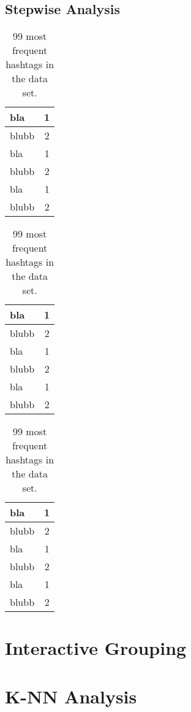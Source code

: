 \subsection{Stepwise Analysis}
        \begin{table}[H]
        	\footnotesize
        	\begin{tabular}[t]{|p{3.2cm}|c|}
        		\hline
        		bla&1\\ \hline
        		blubb&2 \\ \hline
        		bla&1\\ \hline
        		blubb&2 \\ \hline   
        		bla&1\\ \hline
        		blubb&2 \\ \hline   
        	\end{tabular}
        	\hfill
        	\begin{tabular}[t]{|p{3.2cm}|c|}
        		\hline
        		bla&1\\ \hline
        		blubb&2 \\ \hline
        		bla&1\\ \hline
        		blubb&2 \\ \hline   
        		bla&1\\ \hline
        		blubb&2 \\ \hline   
        	\end{tabular}
        	\hfill
        	\begin{tabular}[t]{|p{3.2cm}|c|}
        		\hline
        		bla&1\\ \hline
        		blubb&2 \\ \hline
        		bla&1\\ \hline
        		blubb&2 \\ \hline   
        		bla&1\\ \hline
        		blubb&2 \\ \hline   
        	\end{tabular}
        	\caption{99 most frequent hashtags in the data set.}
        \end{table}


\section{Interactive Grouping}

\section{K-NN Analysis}


